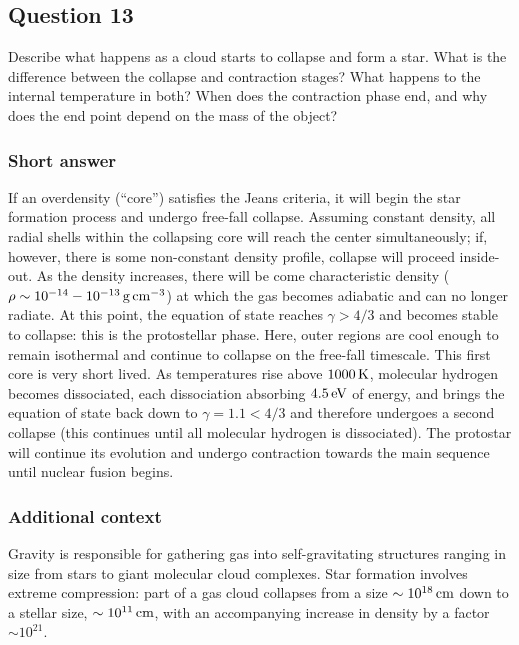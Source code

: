 \documentclass[a4paper,10pt]{article}
\begin{document}

\newpage
\subsection{Question 13}

Describe what happens as a cloud starts to collapse and form a star. What is the difference between the collapse and contraction stages? What happens to the internal temperature in both? When does the contraction phase end, and why does the end point depend on the mass of the object?

\subsubsection{Short answer}

If an overdensity (``core'') satisfies the Jeans criteria, it will begin the star formation process and undergo free-fall collapse. Assuming constant density, all radial shells within the collapsing core will reach the center simultaneously; if, however, there is some non-constant density profile, collapse will proceed inside-out. As the density increases, there will be come characteristic density ($\rho\sim10^{-14}-10^{-13}\,{\rm g\,cm^{-3}}$) at which the gas becomes adiabatic and can no longer radiate. At this point, the equation of state reaches $\gamma>4/3$ and becomes stable to collapse: this is the protostellar phase. Here, outer regions are cool enough to remain isothermal and continue to collapse on the free-fall timescale. This first core is very short lived. As temperatures rise above $1000\,{\rm K}$, molecular hydrogen becomes dissociated, each dissociation absorbing $4.5\,{\rm eV}$ of energy, and brings the equation of state back down to $\gamma=1.1<4/3$ and therefore undergoes a second collapse (this continues until all molecular hydrogen is dissociated). The protostar will continue its evolution and undergo contraction towards the main sequence until nuclear fusion begins.

\subsubsection{Additional context}

Gravity is responsible for gathering gas into self-gravitating structures ranging in size from stars to giant molecular cloud complexes. Star formation involves extreme compression: part of a gas cloud collapses from a size $\sim10^{18}\,{\rm cm}$ down to a stellar size, $\sim10^{11}\,{\rm cm}$, with an accompanying increase in density by a factor $\sim10^{21}$.
\end{document}
